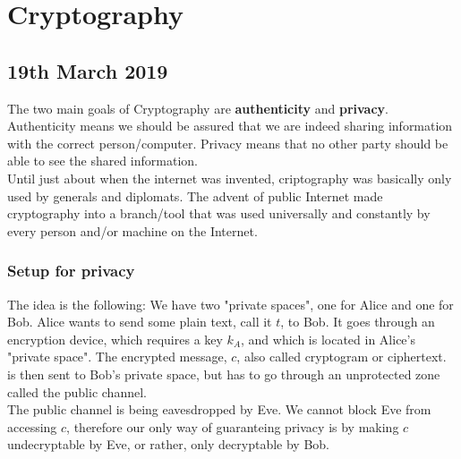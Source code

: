 \documentclass{report}
\theoremstyle{plain}
\theoremstyle{definition}
\theoremstyle{remark}
\begin{document}
\chapter{Cryptography}
\section{19th March 2019}
The two main goals of Cryptography are \textbf{authenticity} and \textbf{privacy}. Authenticity means we should be assured that we are indeed sharing information with the correct person/computer. Privacy means that no other party should be able to see the shared information. \\
 Until just about when the internet was invented, criptography was basically only used by generals and diplomats. The advent of public Internet made cryptography into a branch/tool that was used universally and constantly by every person and/or machine on the Internet.

\subsection{Setup for privacy}
The idea is the following: We have two "private spaces", one for Alice and one for Bob. Alice wants to send some plain text, call it $t$, to Bob. It goes through an encryption device, which requires a key $k_A$, and which is located in Alice's "private space". The encrypted message, $c$, also called cryptogram or ciphertext. is then sent to Bob's private space, but has to go through an unprotected zone called the public channel. \\
 The public channel is being eavesdropped by Eve. We cannot block Eve from accessing $c$, therefore our only way of guaranteing privacy is by making $c$ undecryptable by Eve, or rather, only decryptable by Bob.
\end{document}
